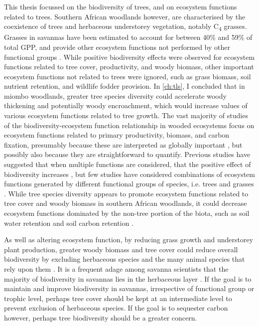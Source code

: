 \begin{refsection}
This thesis focussed on the biodiversity of trees, and on ecosystem functions related to trees. Southern African woodlands however, are characterised by the coexistence of trees and herbaceous understorey vegetation, notably C\textsubscript{4} grasses. Grasses in savannas have been estimated to account for between 40\% \citep{Whitley2011} and 59\% \citep{Lloyd2008} of total GPP, and provide other ecosystem functions not performed by other functional groups \citep{Soliveres2016}. While positive biodiversity effects were observed for ecosystem functions related to tree cover, productivity, and woody biomass, other important ecosystem functions not related to trees were ignored, such as grass biomass, soil nutrient retention, and wildlife fodder provision. In \autoref{ch:tls}, I concluded that in miombo woodlands, greater tree species diversity could accelerate woody thickening and potentially woody encroachment, which would increase values of various ecosystem functions related to tree growth. The vast majority of studies of the biodiversity-ecosystem function relationship in wooded ecosystems focus on ecosystem functions related to primary productivity, biomass, and carbon fixation, presumably because these are interpreted as globally important \citep{Grace2004}, but possibly also because they are straightforward to quantify. Previous studies have suggested that when multiple functions are considered, that the positive effect of biodiversity increases \citep{Hector2007}, but few studies have considered combinations of ecosystem functions generated by different functional groups of species, i.e. trees and grasses \citep{Hooper2005}. While tree species diversity appears to promote ecosystem functions related to tree cover and woody biomass in southern African woodlands, it could decrease ecosystem functions dominated by the non-tree portion of the biota, such as soil water retention and soil carbon retention \citep{Oliveira2005}.

As well as altering ecosystem function, by reducing grass growth and understorey plant production, greater woody biomass and tree cover could reduce overall biodiversity by excluding herbaceous species and the many animal species that rely upon them \citep{Ratajczak2012, Grellier2013}. It is a frequent adage among savanna scientists that the majority of biodiversity in savannas lies in the herbaceous layer \citep{Veldman2015}. If the goal is to maintain and improve biodiversity in savannas, irrespective of functional group or trophic level, perhaps tree cover should be kept at an intermediate level to prevent exclusion of herbaceous species. If the goal is to sequester carbon however, perhaps tree biodiversity should be a greater concern.


\end{refsection}
